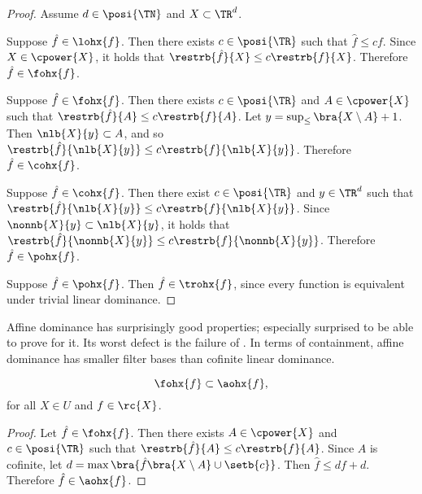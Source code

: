 \documentclass[b5paper, english, oneside]{memoir}
\begin{document}
\begin{proof}
Assume $d \in \posi{\TN}$ and $X \subset \TR^d$.

Suppose $\hat{f} \in \lohx{f}$. Then there exists $c \in \posi{\TR}$ such that $\hat{f} \leq cf$. Since $X \in \cpower{X}$, it holds that $\restrb{\hat{f}}{X} \leq c\restrb{f}{X}$. Therefore $\hat{f} \in \fohx{f}$.

Suppose $\hat{f} \in \fohx{f}$. Then there exists $c \in \posi{\TR}$ and $A \in \cpower{X}$ such that $\restrb{\hat{f}}{A} \leq c\restrb{f}{A}$. Let $y = \sup_{\leq} \bra{X \setminus A} + 1$. Then $\nlb{X}{y} \subset A$, and so $\restrb{\hat{f}}{\nlb{X}{y}} \leq c\restrb{f}{\nlb{X}{y}}$. Therefore $\hat{f} \in \cohx{f}$.

Suppose $\hat{f} \in \cohx{f}$. Then there exist $c \in \posi{\TR}$ and $y \in \TR^d$ such that $\restrb{\hat{f}}{\nlb{X}{y}} \leq c\restrb{f}{\nlb{X}{y}}$. Since $\nonnb{X}{y} \subset \nlb{X}{y}$, it holds that $\restrb{\hat{f}}{\nonnb{X}{y}} \leq c\restrb{f}{\nonnb{X}{y}}$. Therefore $\hat{f} \in \pohx{f}$.

Suppose $\hat{f} \in \pohx{f}$. Then $\hat{f} \in \trohx{f}$, since every function is equivalent under trivial linear dominance.
\end{proof}

Affine dominance has surprisingly good properties; \we{} \were{} especially surprised to be able to prove  for it. Its worst defect is the failure of . In terms of containment, affine dominance has smaller filter bases than cofinite linear dominance.

\begin{theorem}
\label{AffineContainment}
\begin{equation}
\fohx{f} \subset \aohx{f},
\end{equation}
for all $X \in U$ and $f \in \rc{X}$.
\end{theorem}

\begin{proof}
Let $\hat{f} \in \fohx{f}$. Then there exists $A \in \cpower{X}$ and $c \in \posi{\TR}$ such that $\restrb{\hat{f}}{A} \leq c \restrb{f}{A}$. Since $A$ is cofinite, let $d = \max\bra{\hat{f}\bra{X \setminus A} \cup \setb{c}}$. Then $\hat{f} \leq d f + d$. Therefore $\hat{f} \in \aohx{f}$.
\end{proof}
\end{document}
